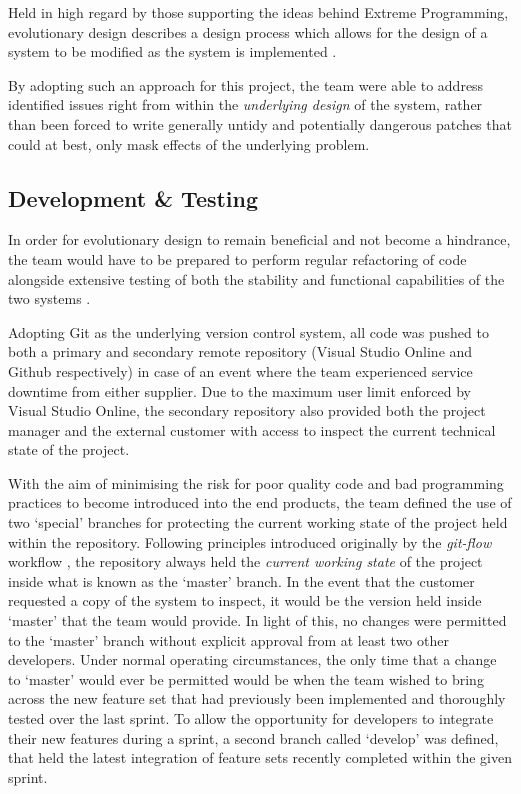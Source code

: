 Held in high regard by those supporting the ideas behind Extreme Programming, evolutionary design describes a design process which allows for the design of a system to be modified as the system is implemented \cite{martin-fowler}. 

By adopting such an approach for this project, the team were able to address identified issues right from within the \textit{underlying design} of the system, rather than been forced to write generally untidy and potentially dangerous patches that could at best, only mask effects of the underlying problem.


\subsection{Development \& Testing}

In order for evolutionary design to remain beneficial and not become a hindrance, the team would have to be prepared to perform regular refactoring of code alongside extensive testing of both the stability and functional capabilities of the two systems \cite{martin-fowler}.

Adopting Git as the underlying version control system, all code was pushed to both a primary and secondary remote repository (Visual Studio Online and Github respectively) in case of an event where the team experienced service downtime from either supplier. Due to the maximum user limit enforced by Visual Studio Online, the secondary repository also provided both the project manager and the external customer with access to inspect the current technical state of the project.

With the aim of minimising the risk for poor quality code and bad programming practices to become introduced into the end products, the team defined the use of two `special' branches for protecting the current working state of the project held within the repository. Following principles introduced originally by the \textit{git-flow} workflow \cite{git-flow}, the repository always held the \textit{current working state} of the project inside what is known as the `master' branch. In the event that the customer requested a copy of the system to inspect, it would be the version held inside `master' that the team would provide. In light of this, no changes were permitted to the  `master' branch without explicit approval from at least two other developers. Under normal operating circumstances, the only time that a change to `master' would ever be permitted would be when the team wished to bring across the new feature set that had previously been implemented and thoroughly tested over the last sprint. To allow the opportunity for developers to integrate their new features during a sprint, a second branch called `develop' was defined, that held the latest integration of feature sets  recently completed within the given sprint. 

